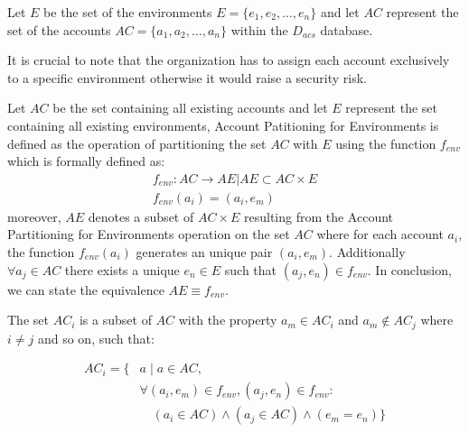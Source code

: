 \vspace{15pt}

Let $E$ be the set of the environments $E = \{e_1, e_2, \ldots, e_n\}$ and let $AC$ represent the set of the accounts $AC = \{a_1, a_2, \ldots, a_n\}$ within the $D_{acs}$ database.

\vspace{15pt}

It is crucial to note that the organization has to assign each account exclusively to a specific environment otherwise it would raise a security risk.

\begin{boxF}
    \begin{definition}
        Let $AC$ be the set containing all existing accounts and let $E$ represent the set containing all existing environments, Account Patitioning for Environments is defined as the operation of partitioning the set $AC$ with $E$ using the function $f_{env}$ which is formally defined as:
        \begin{equation*}
            \begin{gathered}
                f_{env}:AC \rightarrow AE | AE \subset AC \times E\\
                f_{env}(a_i) = (a_i, e_m)
            \end{gathered}
            \label{definition:fenv}
        \end{equation*}
        moreover, $AE$ denotes a subset of $AC \times E$ resulting from the Account Partitioning for Environments operation on the set $AC$ where for each account $a_i$, the function $f_{env}(a_i)$ generates an unique pair $(a_i, e_m)$.
        Additionally $\forall a_j \in AC$ there exists a unique $e_n \in E$ such that $(a_j,e_n) \in f_{env}$.
        In conclusion, we can state the equivalence $AE \equiv f_{env}$.
        \label{definition:environments-partitioning}
    \end{definition}
\end{boxF}

The set $AC_i$ is a subset of $AC$ with the property $a_m \in AC_i$ and $a_m \notin AC_j$ where $i \neq j$ and so on, such that:

\begin{align*}
    AC_i = \{ & a \mid a \in AC, \nonumber \\
    & \forall (a_i, e_m) \in f_{env}, (a_j, e_n) \in f_{env} : \nonumber \\
    & \quad (a_i \in AC) \wedge (a_j \in AC) \wedge (e_m = e_n) \}
\end{align*}

